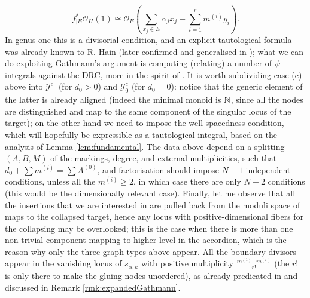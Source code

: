 \[f_{|E}^*\mathcal O_H(1)\cong\mathcal O_E\left(\sum_{x_j\in E}\alpha_jx_j-\sum_{i=1}^r m^{(i)}y_i\right).\]
In genus one this is a divisorial condition, and an explicit tautological formula was already known to R. Hain \cite{Hain} (later confirmed and generalised in \cite{JPPZ}); what we can do exploiting Gathmann's argument is computing (relating) a number of $\psi$-integrals against the DRC, more in the spirit of \cite{BSZ}. It is worth subdividing case (c) above into $\mathcal Y^c_+$ (for $d_0>0$) and $\mathcal Y^c_0$ (for $d_0=0$): notice that the generic element of the latter is already aligned (indeed the minimal monoid is $\mathbb{N}$, since all the nodes are distinguished and map to the same component of the singular locus of the target); on the other hand we need to impose the well-spacedness condition, which will hopefully be expressible as a tautological integral, based on the analysis of Lemma \ref{lem:fundamental}. The data above depend on a splitting $(A,B,M)$ of the markings, degree, and external multiplicities, such that $d_0+\sum m^{(i)}=\sum A^{(0)}$, and factorisation should impose $N-1$ independent conditions, unless all the $m^{(i)}\geq 2$, in which case there are only $N-2$ conditions (this would be the dimensionally relevant case). Finally, let me observe that all the insertions that we are interested in are pulled back from the moduli space of maps to the collapsed target, hence any locus with positive-dimensional fibers for the collapsing may be overlooked; this is the case when there is more than one non-trivial component mapping to higher level in the accordion, which is the reason why only the three graph types above appear. All the boundary divisors appear in the vanishing locus of $s_{\alpha,k}$ with positive multiplicity $\frac{m^{(1)}\cdots m^{(r)}}{r!}$ (the $r!$ is only there to make the gluing nodes unordered), as already predicated in \cite{Vre} and discussed in Remark \ref{rmk:expandedGathmann}.

